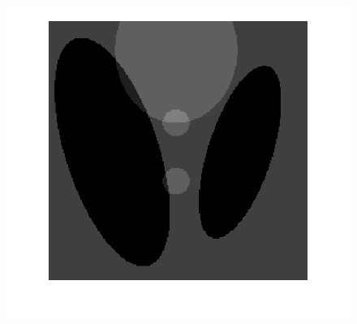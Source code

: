\documentclass[hyperref]{ctexart}
\begin{document}
{\begin{figure}[htbp]
{				\includegraphics[scale=0.2]{11-1.png}
			}
			\quad
			\quad
			\subfigure[pic1.]{
}
\end{figure}}
\end{document}

